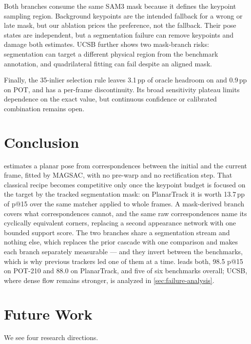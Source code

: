 \documentclass[10pt,twocolumn,letterpaper]{article}
\begin{document}
Both branches consume the same SAM3 mask because it defines the keypoint sampling region.
Background keypoints are the intended fallback for a wrong or late mask, but our ablation prices the preference, not the fallback.
Their pose states are independent, but a segmentation failure can remove keypoints and damage both estimates.
UCSB further shows two mask-branch risks: segmentation can target a different physical region from the benchmark annotation, and quadrilateral fitting can fail despite an aligned mask.

Finally, the 35-inlier selection rule leaves 3.1\,pp of oracle headroom on \pttst and 0.9\,pp on POT, and has a per-frame discontinuity.
Its broad sensitivity plateau limits dependence on the exact value, but continuous confidence or calibrated combination remains open.
\section{Conclusion}
\label{sec:conclusion}

\flatsam estimates a planar pose from correspondences between the initial and the current frame, fitted by MAGSAC, with no pre-warp and no rectification step.
That classical recipe becomes competitive only once the keypoint budget is focused on the target by the tracked segmentation mask: on PlanarTrack it is worth 13.7\,pp of p@15 over the same matcher applied to whole frames.
A mask-derived branch covers what correspondences cannot, and the same raw correspondences name its cyclically equivalent corners, replacing a second appearance network with one bounded support score.
The two branches share a segmentation stream and nothing else, which replaces the prior cascade with one comparison and makes each branch separately measurable --- and they invert between the benchmarks, which is why previous trackers led one of them at a time.
\flatsam leads both, 98.5 p@15 on POT-210 and 88.0 on PlanarTrack, and five of six benchmarks overall; UCSB, where dense flow remains stronger, is analyzed in \cref{sec:failure-analysis}.
\section{Future Work}
\label{sec:future}
We see four research directions.
\end{document}
